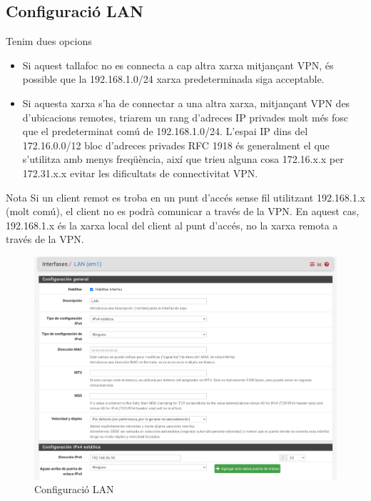 \documentclass[
  10pt,
]{krantz}
\providecommand{\tightlist}{%
  \setlength{\itemsep}{0pt}\setlength{\parskip}{0pt}}
\begin{document}
\hypertarget{configuraciuxf3-lan}{%
\subsection{Configuració LAN}\label{configuraciuxf3-lan}}

Tenim dues opcions

\begin{itemize}
\tightlist
\item
  Si aquest tallafoc no es connecta a cap altra xarxa mitjançant VPN, és possible que la 192.168.1.0/24 xarxa predeterminada siga acceptable.
\item
  Si aquesta xarxa s'ha de connectar a una altra xarxa, mitjançant VPN des d'ubicacions remotes, triarem un rang d'adreces IP privades molt més fosc que el predeterminat comú de 192.168.1.0/24. L'espai IP dins del 172.16.0.0/12 bloc d'adreces privades RFC 1918 és generalment el que s'utilitza amb menys freqüència, així que trieu alguna cosa 172.16.x.x per 172.31.x.x evitar les dificultats de connectivitat VPN.
\end{itemize}

\begin{rmdwarn}{Nota}
Si un client remot es troba en un punt d'accés sense fil utilitzant 192.168.1.x (molt comú), el client no es podrà comunicar a través de la VPN. En aquest cas, 192.168.1.x és la xarxa local del client al punt d'accés, no la xarxa remota a través de la VPN.

\end{rmdwarn}

\begin{figure}
\centering
\includegraphics{imatges/pfsense_LAN.png}
\caption{Configuració LAN}
\end{figure}
\end{document}
